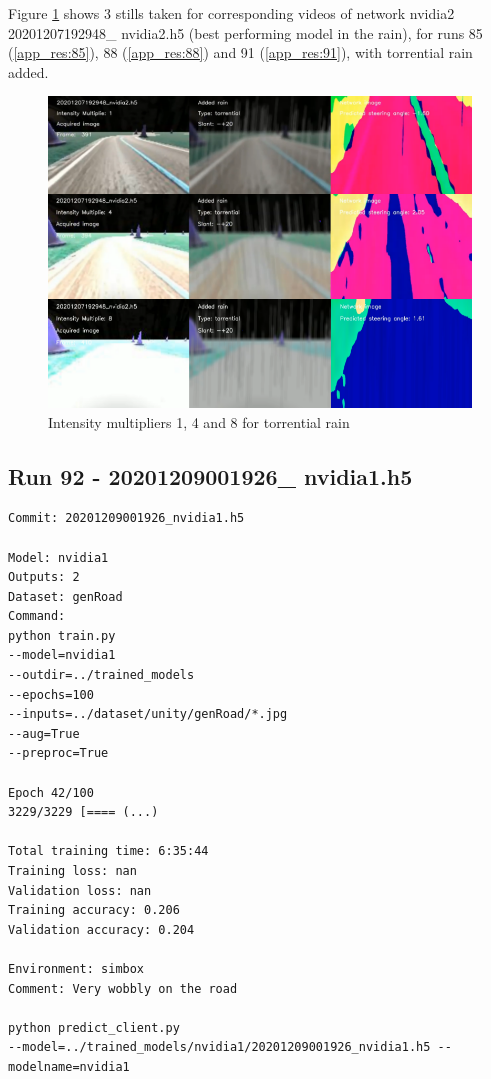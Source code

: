 Figure \ref{fig:20201207192948_nvidia2_mult_1_4_8_torrential} shows 3 stills taken for corresponding videos of network nvidia2 20201207192948\_ nvidia2.h5 (best performing model in the rain), for runs 85 (\ref{app_res:85}), 88 (\ref{app_res:88}) and 91 (\ref{app_res:91}), with torrential rain added.

\begin{figure}[ht]
 \centering 
 \includegraphics[width=\textwidth]{Figures/20201207192948_nvidia2_mult_1_4_8_torrential.png}
 \caption{Intensity multipliers 1, 4 and 8 for torrential rain}
 \label{fig:20201207192948_nvidia2_mult_1_4_8_torrential}
\end{figure}

\subsection{Run 92 - 20201209001926\_ nvidia1.h5 }
\label{app_res:92}
\begin{verbatim}
Commit: 20201209001926_nvidia1.h5

Model: nvidia1 
Outputs: 2
Dataset: genRoad
Command:
python train.py
--model=nvidia1
--outdir=../trained_models
--epochs=100
--inputs=../dataset/unity/genRoad/*.jpg
--aug=True
--preproc=True

Epoch 42/100
3229/3229 [==== (...)

Total training time: 6:35:44
Training loss: nan
Validation loss: nan
Training accuracy: 0.206
Validation accuracy: 0.204

Environment: simbox
Comment: Very wobbly on the road

python predict_client.py
--model=../trained_models/nvidia1/20201209001926_nvidia1.h5 --modelname=nvidia1
\end{verbatim}

